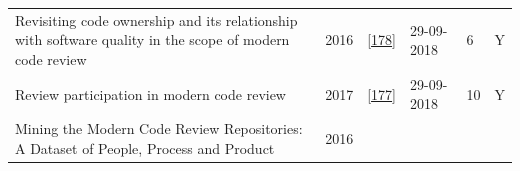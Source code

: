 \documentclass[]{book}
\begin{document}
\begin{longtable}[]{@{}llllll@{}}
\begin{minipage}[t]{0.47\columnwidth}
Revisiting code ownership and its relationship with software quality in
the scope of modern code review\strut
\end{minipage} & \begin{minipage}[t]{0.03\columnwidth}\raggedright\strut
2016\strut
\end{minipage} & \begin{minipage}[t]{0.13\columnwidth}\raggedright\strut
{[}\protect\hyperlink{ref-thongtanunam2016revisiting}{178}{]}\strut
\end{minipage} & \begin{minipage}[t]{0.06\columnwidth}\raggedright\strut
29-09-2018\strut
\end{minipage} & \begin{minipage}[t]{0.07\columnwidth}\raggedright\strut
6\strut
\end{minipage} & \begin{minipage}[t]{0.08\columnwidth}\raggedright\strut
Y\strut
\end{minipage}\tabularnewline
\begin{minipage}[t]{0.47\columnwidth}\raggedright\strut
Review participation in modern code review\strut
\end{minipage} & \begin{minipage}[t]{0.03\columnwidth}\raggedright\strut
2017\strut
\end{minipage} & \begin{minipage}[t]{0.13\columnwidth}\raggedright\strut
{[}\protect\hyperlink{ref-thongtanunam2017review}{177}{]}\strut
\end{minipage} & \begin{minipage}[t]{0.06\columnwidth}\raggedright\strut
29-09-2018\strut
\end{minipage} & \begin{minipage}[t]{0.07\columnwidth}\raggedright\strut
10\strut
\end{minipage} & \begin{minipage}[t]{0.08\columnwidth}\raggedright\strut
Y\strut
\end{minipage}\tabularnewline
\begin{minipage}[t]{0.47\columnwidth}\raggedright\strut
Mining the Modern Code Review Repositories: A Dataset of People, Process
and Product\strut
\end{minipage} & \begin{minipage}[t]{0.03\columnwidth}\raggedright\strut
2016\strut
\end{minipage} & \begin{minipage}[t]{0.13\columnwidth}\raggedright\strut

\end{minipage}
\end{longtable}
\end{document}
